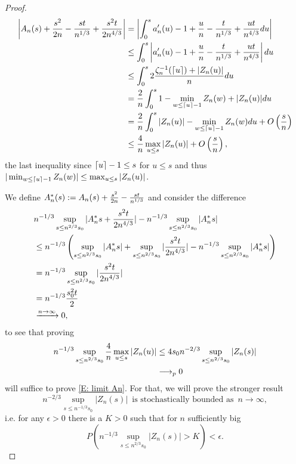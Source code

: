 \begin{proof}
    \begin{align*}
    \left| A_n(s) + \frac{s^2}{2n} - \frac{st}{n^{1 / 3}}  + \frac{s^2t}{2n^{4 / 3}}  \right| 
    &= \left| \int_{0}^{s} a'_n(u) - 1 + \frac{u}{n} - \frac{t}{n^{1 / 3}} + \frac{ut}{n^{4 / 3}} du \right| \\
    &\leq \int_{0}^{s} \left|a'_n(u) - 1 + \frac{u}{n} - \frac{t}{n^{1 / 3}} + \frac{ut}{n^{4 / 3}} \right| du \\
    &\leq \int_{0}^{s} 2 \frac{\zeta^{-1}_n(\lceil u\rceil) + |Z_n(u)|}{n} du \\
    &= \frac{2}{n}  \int_{0}^{s} 1-\min_{w \leq \lceil u\rceil-1} Z_n(w)  + |Z_n(u)| du \\
    &= \frac{2}{n}  \int_{0}^{s} |Z_n(u)| - \min_{w \leq \lceil u\rceil-1} Z_n(w) du + O\left(\frac{s}{n}\right) \\
    &\leq \frac{4}{n} \max_{u \leq s} |Z_n(u)| + O\left(\frac{s}{n}\right),
    \end{align*}
    the last inequality since $\lceil u\rceil-1 \leq s$ for $u\leq s$ and thus $|\min_{w \leq \lceil u\rceil-1}Z_n(w)| \leq \max_{u \leq s}|Z_n(u)|$.
    
    We define $A^*_n(s) := A_n(s) + \frac{s^2}{2n} - \frac{st}{n^{1 / 3}}$ and consider the difference
    \begin{align*}
    &n^{-1 / 3}\sup_{s \leq n^{2 / 3} s_0 } | A^*_n{s} + \frac{s^2t}{2n^{4 / 3}}  | - n^{-1 / 3}\sup_{s \leq n^{2 / 3} s_0 } | A^*_n{s} | \\
    &\leq n^{-1 / 3} \left( \sup_{s \leq n^{2 / 3} s_0 } | A^*_n{s} | + \sup_{s \leq n^{2 / 3} s_0 } |\frac{s^2t}{2n^{4 / 3}}|  - n^{-1 / 3}\sup_{s \leq n^{2 / 3} s_0 } | A^*_n{s} | \right) \\
    &= n^{-1 / 3} \sup_{s \leq n^{2 / 3} s_0 } |\frac{s^2t}{2n^{4 / 3}}| \\
    &= n^{-1 / 3} \frac{s_0^2t}{2} \\
    &\xrightarrow{n \rightarrow \infty} 0,
    \end{align*}
    to see that proving
    \begin{align*}
    n^{-1 / 3} \sup_{s \leq n^{2 / 3} s_0 } \frac{4}{n} \max_{u \leq s} |Z_n(u)| 
    &\leq 4 s_0 n^{-2 / 3} \sup_{s \leq n^{2 / 3} s_0 } |Z_n(s)| \\
    &\longrightarrow_p 0 
    \end{align*}
    will suffice to prove \ref{E: limit An}.
    For that, we will prove the stronger result 
    \begin{equation}
    n^{-2/3} \sup_{s\leq n^{-1/3} s_0} |Z_n(s)| 
    \enspace \text{is stochastically bounded as} \enspace n \rightarrow \infty ,
    \end{equation} 
    i.e. for any 
    $ \epsilon > 0 $ 
    there is a
    $ K > 0 $
    such that for $n$ sufficiently big 
    \begin{equation} \label{E: stoch bounded}
    P\left( n^{-1/3} \sup_{s\leq n^{2/3} s_0} |Z_n(s)| > K \right) < \epsilon. 
    \end{equation}
    

\end{proof}

